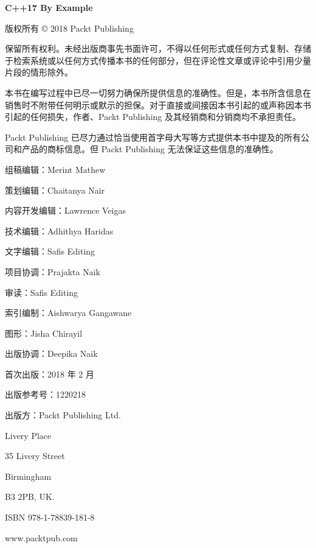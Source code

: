 \thispagestyle{empty}
\begingroup
\parindent 0bp
\parskip 0bp
\vspace*{-14.7bp}%
{\sffamily\bfseries\fontsize{20bp}{23bp}\selectfont C++17 By Example\par}
\vspace{4.5bp}
{\fontsize{8.2bp}{9.9bp}\selectfont
版权所有 © 2018 Packt Publishing\par
\vspace{9.0bp}
保留所有权利。未经出版商事先书面许可，不得以任何形式或任何方式复制、存储于检索系统或以任何方式传播本书的任何部分，但在评论性文章或评论中引用少量片段的情形除外。\par
\vspace{9.0bp}
本书在编写过程中已尽一切努力确保所提供信息的准确性。但是，本书所含信息在销售时不附带任何明示或默示的担保。对于直接或间接因本书引起的或声称因本书引起的任何损失，作者、Packt Publishing 及其经销商和分销商均不承担责任。\par
\vspace{9.0bp}
Packt Publishing 已尽力通过恰当使用首字母大写等方式提供本书中提及的所有公司和产品的商标信息。但 Packt Publishing 无法保证这些信息的准确性。\par
\vspace{9.0bp}
组稿编辑：Merint Mathew\par
策划编辑：Chaitanya Nair\par
内容开发编辑：Lawrence Veigas\par
技术编辑：Adhithya Haridas\par
文字编辑：Safis Editing\par
项目协调：Prajakta Naik\par
审读：Safis Editing\par
索引编制：Aishwarya Gangawane\par
图形：Jisha Chirayil\par
出版协调：Deepika Naik\par
\vspace{9.0bp}
首次出版：2018 年 2 月\par
\vspace{9.0bp}
出版参考号：1220218\par
\vspace{9.0bp}
出版方：Packt Publishing Ltd.\par
Livery Place\par
35 Livery Street\par
Birmingham\par
B3 2PB, UK.\par
\vspace{9.0bp}
ISBN 978-1-78839-181-8\par
\vspace{9.0bp}
{\idxnumfont\fontsize{9bp}{9.9bp}\selectfont www.packtpub.com}\par}
\endgroup
